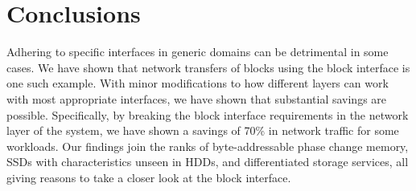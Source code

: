 \documentclass[10pt,twocolumn]{article}
\begin{document}
\section{Conclusions}
\label{sec:conclusions}

Adhering to specific interfaces in generic domains can be detrimental in some
cases. %
We have shown that network transfers of blocks using the block interface is one
such example. %
With minor modifications to how different layers can work with most appropriate
interfaces, we have shown that substantial savings are possible. %
Specifically, by breaking the block interface requirements in the network layer
of the system, we have shown a savings of 70\% in network traffic for some
workloads. %
Our findings join the ranks of byte-addressable phase change memory, SSDs with
characteristics unseen in HDDs, and differentiated storage services, all giving
reasons to take a closer look at the block interface. %
\end{document}
